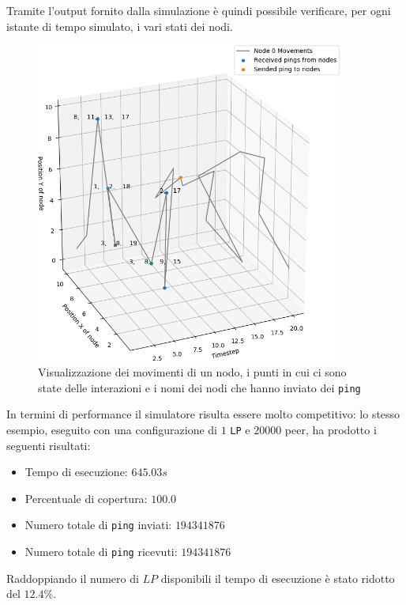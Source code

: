 Tramite l'output fornito dalla simulazione è quindi possibile verificare, per ogni istante di tempo simulato, i vari stati dei nodi.
\begin{figure}[H]
    \centering
    \includegraphics[width=0.9\textwidth]{images/lunes_wireless_plot.png}
    \caption{Visualizzazione dei movimenti di un nodo, i punti in cui ci sono state delle interazioni e i nomi dei nodi che hanno inviato dei \texttt{ping}}
\end{figure}
In termini di performance il simulatore risulta essere molto competitivo: lo stesso esempio, eseguito con una configurazione di $1$ \texttt{LP} e $20000$ peer, ha prodotto i seguenti risultati:
\begin{itemize}
    \item Tempo di esecuzione: $645.03s$
    \item Percentuale di copertura: $100.0$
    \item Numero totale di \texttt{ping} inviati: $194341876$
    \item Numero totale di \texttt{ping} ricevuti: $194341876$
\end{itemize}
Raddoppiando il numero di $LP$ disponibili il tempo di esecuzione è stato ridotto del $12.4\%$.

